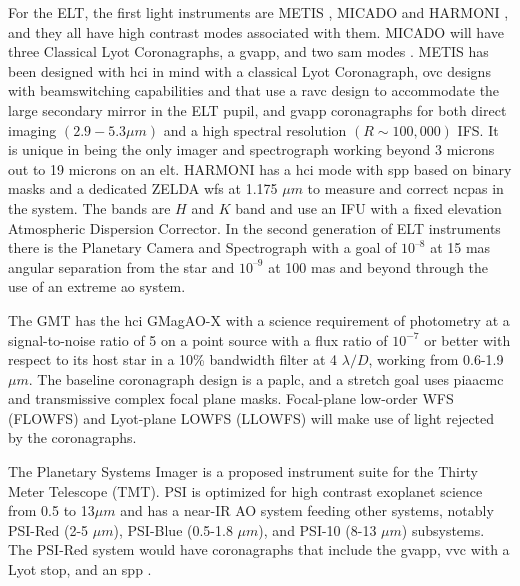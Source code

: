 \documentclass[letterpaper]{ar-1col}
\newcommand{\ld}{$\lambda/D$}
\begin{document}
For the ELT, the first light instruments are METIS \citep{Brandl22}, MICADO \citep{Sturm24} and HARMONI \citep{Thatte22}, and they all have high contrast modes associated with them.
%
MICADO will have three Classical Lyot Coronagraphs, a \ac{gvapp}, and two \ac{sam} modes \citep{Huby24}. 
%
METIS has been designed with \ac{hci} in mind \citep{Kenworthy16,Absil24} with a classical Lyot Coronagraph, \ac{ovc} designs with beamswitching capabilities and that use a \ac{ravc} design to accommodate the large secondary mirror in the ELT pupil, and \ac{gvapp} coronagraphs for both direct imaging $(2.9-5.3\mu m)$ and a high spectral resolution $(R\sim 100,000)$ IFS.
%
It is unique in being the only imager and spectrograph working beyond 3 microns out to 19 microns on an \ac{elt}.
%
HARMONI has a \ac{hci} mode \citep{Houlle21} with \ac{spp} based on binary masks \citep{Carlotti23} and a dedicated ZELDA \ac{wfs} at 1.175 $\mu m$ to measure and correct \acp{ncpa} in the system.
%
The bands are $H$ and $K$ band and use an IFU with a fixed elevation Atmospheric Dispersion Corrector.
%
%
%
In the second generation of ELT instruments there is the Planetary Camera and Spectrograph \citep[PCS; ][]{Kasper21} with a goal of $10^{–8}$ at
15 mas angular separation
from the star and $10^{–9}$ at 100 mas and beyond through the use of an extreme \ac{ao} system. 

The GMT	has the \ac{hci} GMagAO-X \citep{Males24} with a science requirement of photometry at a signal-to-noise ratio of 5 on a point source with a flux ratio of $10^{-7}$ or better with respect to its host star in a 10\% bandwidth filter at 4 \ld{}, working from 0.6-1.9 $\mu m$.
%
The baseline coronagraph design is a \ac{paplc}, and a stretch goal uses \ac{piaacmc} and transmissive complex focal plane masks.
%
Focal-plane low-order WFS (FLOWFS) and Lyot-plane LOWFS (LLOWFS) will make use of light rejected by the coronagraphs.


The Planetary Systems Imager \citep[PSI; ][]{Fitzgerald22} is a proposed instrument suite for the Thirty Meter Telescope (TMT).
%
PSI is optimized for high contrast exoplanet science from 0.5 to 13$\mu m$ and has a near-IR AO system feeding other systems, notably PSI-Red (2-5 $\mu m$), PSI-Blue (0.5-1.8 $\mu m$), and PSI-10 (8-13 $\mu m$) subsystems. 
%
The PSI-Red system would have coronagraphs that include the \ac{gvapp}, \ac{vvc} with a Lyot stop, and an \ac{spp} \citep{Jensen-Clem21}.
\end{document}
